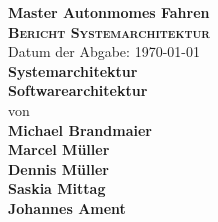 
\begin{titlepage}
    \begin{center}
        \begin{figure}[htbp]
            \centering
            \qquad\qquad
        \end{figure}

        \textbf{Master Autonmomes Fahren}\\
        \vspace{1.5cm}
        \LARGE\textbf{\textsc{Bericht Systemarchitektur}}\\
        \vspace{1.5cm}
        \normalsize
        Datum der Abgabe: \today \\
        \huge \textbf{Systemarchitektur\\Softwarearchitektur} \\
        \normalsize
        \vspace{0.7cm}
        von\\
        \vspace{1cm}
        \large \textbf{Michael Brandmaier\\Marcel Müller\\Dennis Müller\\Saskia Mittag\\Johannes Ament}\\
        \normalsize
        \vspace{0.2cm}
    \end{center}
\end{titlepage}
\raggedbottom